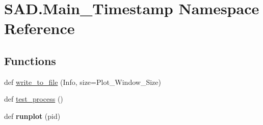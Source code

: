 \hypertarget{namespaceSAD_1_1Main__Timestamp}{}\section{S\+A\+D.\+Main\+\_\+\+Timestamp Namespace Reference}
\label{namespaceSAD_1_1Main__Timestamp}
\subsection*{Functions}
\begin{DoxyCompactItemize}
\item 
def \hyperlink{namespaceSAD_1_1Main__Timestamp_acdb084935eb70403c7dd2d2ca82f49a5}{write\+\_\+to\+\_\+file} (Info, size=Plot\+\_\+\+Window\+\_\+\+Size)
\item 
def \hyperlink{namespaceSAD_1_1Main__Timestamp_a8238248c631be66c271ea6a591b587b4}{test\+\_\+process} ()
\item 
def {\bfseries runplot} (pid)\hypertarget{namespaceSAD_1_1Main__Timestamp_aeca6620195a2846b0df4e82154c0c9e0}{}\label{namespaceSAD_1_1Main__Timestamp_aeca6620195a2846b0df4e82154c0c9e0}

\end{DoxyCompactItemize}
